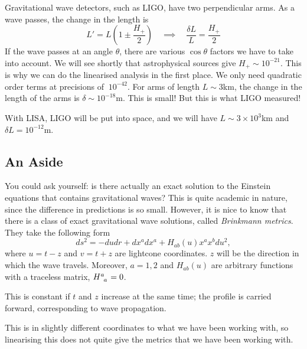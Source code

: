 Gravitational wave detectors, such as LIGO, have two perpendicular arms. As a wave passes, the change in the length is
\begin{equation}
  L' = L\left(1 \pm \frac{H_{+}}{2}\right) \quad \implies \quad \frac{\delta L}{L} = \frac{H_+}{2}
\end{equation}
If the wave passes at an angle $\theta$, there are various $\cos\theta$ factors we have to take into account.
We will see shortly that astrophysical sources give $H_+ \sim 10^{-21}$. This is why we can do the linearised analysis in the first place. We only need quadratic order terms at precisions of $~ 10^{-42}$.
For arms of length $L \sim 3$km, the change in the length of the arms is $\delta \sim 10^{-18}$m. This is small! But this is what LIGO measured!

With LISA, LIGO will be put into space, and we will have $L \sim 3 \times 10^3$km and $\delta L = 10^{-12}$m.

\subsection*{An Aside}%

You could ask yourself: is there actually an exact solution to the Einstein equations that contains gravitational waves? This is quite academic in nature, since the difference in predictions is so small. However, it is nice to know that there is a class of exact gravitational wave solutions, called \emph{Brinkmann metrics}.
They take the following form
\begin{equation}
  ds^2 = -du dr + dx^a dx^{a} + H_{ab} (u) x^{a} x^{b} du^2,
\end{equation}
where $u = t - z$ and $v = t + z$ are lightcone coordinates. $z$ will be the direction in which the wave travels.
Moreover, $a = 1, 2$ and $H_{ab}(u)$ are arbitrary functions with a traceless matrix, $H\indices{^{a}_{a}} = 0$.

This is constant if $t$ and $z$ increase at the same time; the profile is carried forward, corresponding to wave propagation.

This is in slightly different coordinates to what we have been working with, so linearising this does not quite give the metrics that we have been working with.
